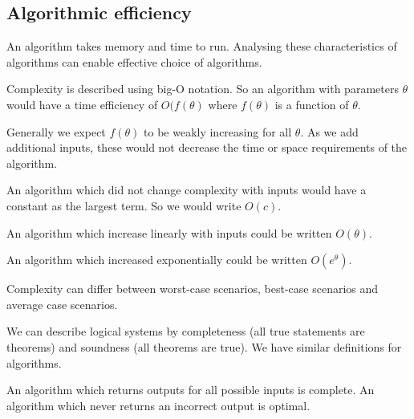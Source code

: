 
\subsection{Algorithmic efficiency}

An algorithm takes memory and time to run. Analysing these characteristics of algorithms can enable effective choice of algorithms.

Complexity is described using big-O notation. So an algorithm with parameters \(\theta \) would have a time efficiency of \(O(f(\theta )\) where \(f(\theta )\) is a function of \(\theta \).

Generally we expect \(f(\theta )\) to be weakly increasing for all \(\theta \). As we add additional inputs, these would not decrease the time or space requirements of the algorithm.

An algorithm which did not change complexity with inputs would have a constant as the largest term. So we would write \(O(c)\).

An algorithm which increase linearly with inputs could be written \(O(\theta )\).

An algorithm which increased exponentially could be written \(O(e^\theta )\).

Complexity can differ between worst-case scenarios, best-case scenarios and average case scenarios.

We can describe logical systems by completeness (all true statements are theorems) and soundness (all theorems are true). We have similar definitions for algorithms.

An algorithm which returns outputs for all possible inputs is complete. An algorithm which never returns an incorrect output is optimal.

